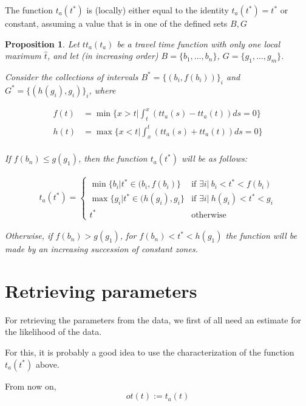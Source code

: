 \documentclass{article}
\newtheorem{prop}{Proposition}
\begin{document}
The function \(t_a(t^*)\) is (locally) either equal to the identity \(t_a(t^*) = t^*\) or constant, assuming a value that is in one of the defined sets \(B, G\)

\begin{prop}
  Let \(tt_a(t_a)\) be a travel time function with only one local maximum \(\hat{t}\),
  and let (in increasing order) \(B = \{b_1, \dots, b_n\}\), \(G = \{g_1, \dots, g_m\}\).


  Consider the collections of intervals \(B^* = \{(b_i, f(b_i))\}_i\) and \(G^* = \{(h(g_i), g_i)\}_i\), where
  
  \begin{align*}
    f(t) & = \min\{x>t | \int_t^x(tt_a(s) - tt_a(t)) ds = 0\} \\
    h(t) & = \max\{x<t | \int_x^t(tt_a(s) + tt_a(t)) ds = 0\} \\
  \end{align*}

  If \(f(b_n) \leq g(g_1)\), then the function \(t_a(t^*)\) will be as follows:

  \begin{align*}
    t_a(t^*) = 
    \begin{cases}
      \min \{b_i | t^* \in (b_i, f(b_i)\} & \text{if } \exists i |\ b_i < t^* < f(b_i) \\
      \max \{g_i | t^* \in (h(g_i), g_i\} & \text{if } \exists i |\ h(g_i) < t^* < g_i \\
      t^* & \text{otherwise}
    \end{cases}
  \end{align*}

  Otherwise, if \(f(b_n) > g(g_1)\), for \(f(b_n) < t^* < h(g_1)\) the function will be made by an increasing succession of constant zones.
\end{prop}

\section{Retrieving parameters}

For retrieving the parameters from the data, we first of all need an estimate for the likelihood of the data.

For this, it is probably a good idea to use the characterization of the function \(t_a(t^*)\) above.

From now on,
\begin{equation*}
  ot(t) := t_a(t)
\end{equation*}
\end{document}
